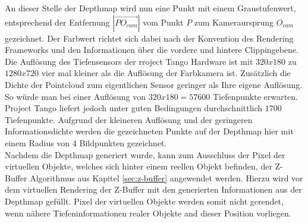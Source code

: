 An dieser Stelle der Depthmap wird nun eine Punkt mit einem Graustufenwert, entsprechend der Entfernung \(|\overrightarrow{PO_{cam}}|\) vom Punkt \(P\) zum Kameraursprung \(O_{cam}\) gezeichnet. Der Farbwert richtet sich dabei nach der Konvention des Rendering Frameworks und den Informationen über die vordere und hintere Clippingebene.\\

Die Auflösung des Tiefensensors der rroject Tango Hardware ist mit \(320x180\) zu \(1280x720\) vier mal kleiner als die Auflösung der Farbkamera ist. Zusätzlich die Dichte der Pointcloud zum eigentlichen Sensor geringer als Ihre eigene Auflösung. So würde man bei einer Auflösung von \(320x180 = 57600\) Tiefenpunkte erwarten. Project Tango liefert jedoch unter guten Bedingungen durchschnittlich \(1700\) Tiefenpunkte. Aufgrund der kleineren Auflösung und der geringeren Informationsdichte werden die gezeichneten Punkte auf der Depthmap hier mit einem Radius von 4 Bildpunkten gezeichnet. \\

Nachdem die Depthmap generiert wurde, kann zum Ausschluss der Pixel der virtuellen Objekte, welches sich hinter einem reellen Objekt befinden, der Z-Buffer Algorithmus aus Kapitel \ref{sec:z-buffer} angewendet werden. Hierzu wird vor dem virtuellen Rendering der Z-Buffer mit den generierten Informationen aus der Depthmap gefüllt. Pixel der virtuellen Objekte werden somit nicht gerendet, wenn nähere Tiefeninformationen realer Objekte and dieser Position vorliegen. 


